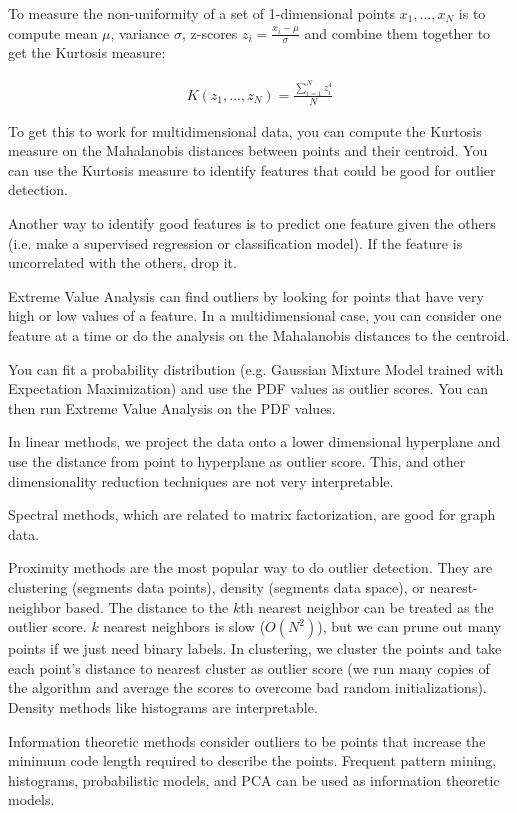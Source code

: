 \documentclass[a4paper]{article}
\begin{document}
To measure the non-uniformity of a set of 1-dimensional points $x_1, ..., x_N$
is to compute mean $\mu$, variance $\sigma$, z-scores $z_i = \frac{x_i - \mu}{
\sigma}$ and combine them together to get the Kurtosis measure:

\begin{align}
  K(z_1, ..., z_N) = \frac{\sum_{i=1}^{N}{z_i^4}}{N}
\end{align}

To get this to work for multidimensional data, you can compute the Kurtosis
measure on the Mahalanobis distances between points and their centroid. You can
use the Kurtosis measure to identify features that could be good for outlier
detection.

Another way to identify good features is to predict one feature given the
others (i.e. make a supervised regression or classification model). If the
feature is uncorrelated with the others, drop it.

Extreme Value Analysis can find outliers by looking for points that have
very high or low values of a feature. In a multidimensional case, you can
consider one feature at a time or do the analysis on the Mahalanobis distances
to the centroid.

You can fit a probability distribution (e.g. Gaussian Mixture Model trained
with Expectation Maximization) and use the PDF values as outlier scores. You can
then run Extreme Value Analysis on the PDF values.

In linear methods, we project the data onto a lower dimensional hyperplane and
use the distance from point to hyperplane as outlier score. This, and other
dimensionality reduction techniques are not very interpretable.

Spectral methods, which are related to matrix factorization, are good for
graph data.

Proximity methods are the most popular way to do outlier detection. They are
clustering (segments data points), density (segments data space), or
nearest-neighbor based. The distance to the $k$th nearest neighbor can be
treated as the outlier score. $k$ nearest neighbors is slow ($O(N^2)$), but
we can prune out many points if we just need binary labels. In clustering,
we cluster the points and take each point's distance to nearest cluster as
outlier score (we run many copies of the algorithm and average the scores to
overcome bad random initializations). Density methods like histograms are
interpretable.

Information theoretic methods consider outliers to be points that increase the
minimum code length required to describe the points. Frequent pattern mining,
histograms, probabilistic models, and PCA can be used as information theoretic
models.
\end{document}
